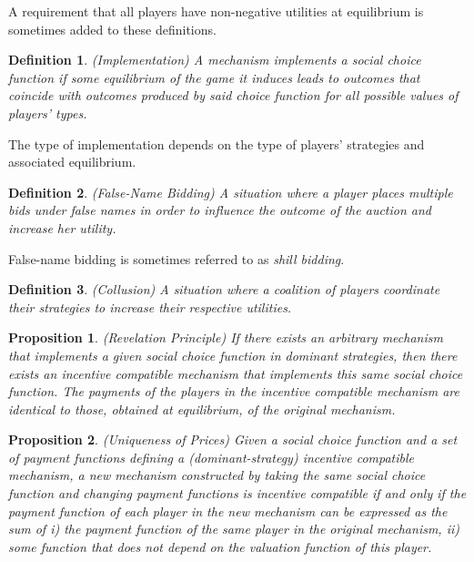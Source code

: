 \documentclass{article}
\newtheorem{proposition}{Proposition}
\newtheorem{definition}{Definition}
\begin{document}
A requirement that all players have non-negative utilities at equilibrium is sometimes added to these definitions.

\begin{definition}
(Implementation) A mechanism implements a social choice function if some equilibrium of the game it induces leads to outcomes that coincide with outcomes produced by said choice function for all possible values of players' types.
\end{definition}

The type of implementation depends on the type of players' strategies and associated equilibrium.

\begin{definition}
(False-Name Bidding) A situation where a player places multiple bids under false names in order to influence the outcome of the auction and increase her utility.
\end{definition}

False-name bidding is sometimes referred to as \textit{shill bidding}.

\begin{definition}
(Collusion) A situation where a coalition of players coordinate their strategies to increase their respective utilities.
\end{definition}

\begin{proposition}
(Revelation Principle) If there exists an arbitrary mechanism that implements a given social choice function in dominant strategies, then there exists an incentive compatible mechanism that implements this same social choice function. The payments of the players in the incentive compatible mechanism are identical to those, obtained at equilibrium, of the original mechanism.
\end{proposition}

\begin{proposition}
(Uniqueness of Prices) Given a social choice function and a set of payment functions defining a (dominant-strategy) incentive compatible mechanism, a new mechanism constructed by taking the same social choice function and changing payment functions is incentive compatible if and only if the payment function of each player in the new mechanism can be expressed as the sum of i) the payment function of the same player in the original mechanism, ii) some function that does not depend on the valuation function of this player.
\end{proposition}
\end{document}
